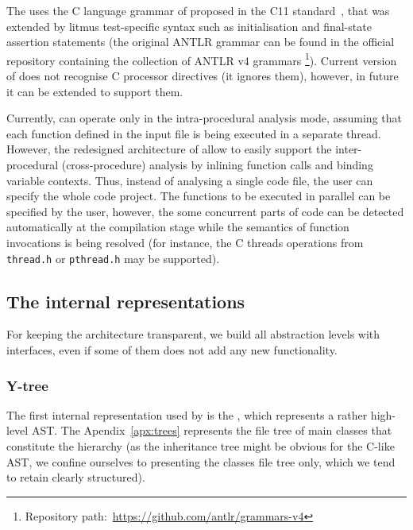 The \porthos[2] uses the C language grammar of proposed in the C11 standard~\cite{jtc2011sc22}, that was extended by litmus test-specific syntax such as initialisation and final-state assertion statements (the original ANTLR grammar can be found in the official repository containing the collection of ANTLR v4 grammars%
\footnote{Repository path:~\url{https://github.com/antlr/grammars-v4}}).%
Current version of \porthos[2] does not recognise C processor directives (it ignores them), however, in future it can be extended to support them.

Currently, \porthos[2] can operate only in the intra-procedural analysis mode, assuming that each function defined in the input file is being executed in a separate thread.
However, the redesigned architecture of \porthos[2] allow to easily support the inter-procedural (cross-procedure) analysis by inlining function calls and binding variable contexts.
Thus, instead of analysing a single code file, the user can specify the whole code project.
The functions to be executed in parallel can be specified by the user, however, the some concurrent parts of code can be detected automatically at the compilation stage while the semantics of function invocations is being resolved (for instance, the C threads operations from \texttt{thread.h} or \texttt{pthread.h} may be supported).



\subsection{The internal representations}
\label{ch:impl:model}

For keeping the architecture transparent, we build all abstraction levels with interfaces, even if some of them does not add any new functionality.%

\subsubsection{Y-tree}
\label{ch:impl:model:ytree}

The first internal representation used by \porthos[2] is the \textit{\ytree{}}, which represents a rather high-level AST.
The Apendix~\ref{apx:trees} represents the file tree of main classes that constitute the \ytree{} hierarchy (as the inheritance tree might be obvious for the C-like AST, we confine ourselves to presenting the classes file tree only, which we tend to retain clearly structured).

